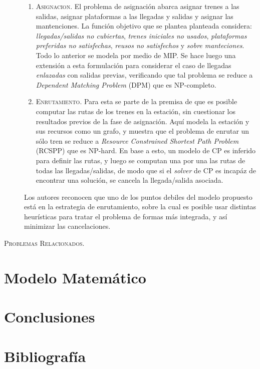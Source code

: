 \documentclass[letter, 10pt]{article}
\begin{document}
\begin{description}
	\begin{enumerate}
		\item \textsc{Asignacion.} El problema de asignación abarca asignar trenes a las salidas, asignar plataformas a las llegadas y salidas y asignar las mantenciones. La función objetivo que se plantea planteada considera: \textit{llegadas/salidas no cubiertas}, \textit{trenes iniciales no usados}, \textit{plataformas preferidas no satisfechas}, \textit{reusos no satisfechos} y \textit{sobre manteciones}. Todo lo anterior se modela por medio de MIP. Se hace luego una extensión a esta formulación para considerar el caso de llegadas \textit{enlazadas} con salidas previas, verificando que tal problema se reduce a \textit{Dependent Matching Problem} (DPM) que es NP-completo.  
		\item \textsc{Enrutamiento.} Para esta se parte de la premisa de que es posible computar las rutas de los trenes en la estación, sin cuestionar los resultados previos de la fase de asignación. Aquí modela la estación y sus recursos como un grafo, y muestra que el problema de enrutar un sólo tren se reduce a \textit{Resource Constrained Shortest Path Problem} (RCSPP) que es NP-hard. En base a esto, un modelo de CP es inferido para definir las rutas, y luego se computan una por una las rutas de todas las llegadas/salidas, de modo que si el \textit{solver} de CP es incapáz de encontrar una solución, se cancela la llegada/salida asociada.
	\end{enumerate}
	Los autores reconocen que uno de los puntos debiles del modelo propuesto está en la estrategia de enrutamiento, sobre la cual es posible usar distintas heurísticas para tratar el problema de formas más integrada, y así minimizar las cancelaciones. 



	\item[\textsc{Problemas Relacionados.}]
\end{description}

\section{Modelo Matemático} \label{model}


\section{Conclusiones} \label{conclutions}


\section{Bibliografía}



\end{document}
